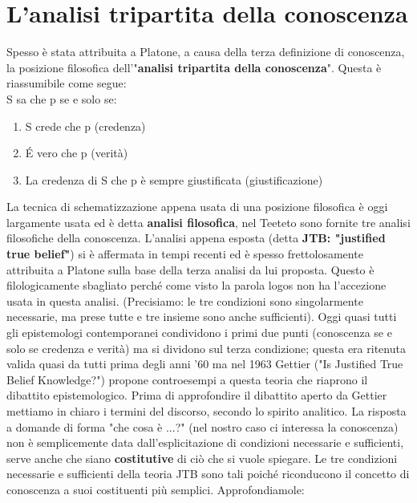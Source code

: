 \documentclass[10pt,a4paper]{article}
\begin{document}
\newpage

\section{L'analisi tripartita della conoscenza}
Spesso è stata attribuita a Platone, a causa della terza definizione di conoscenza, la posizione filosofica dell'"\textbf{analisi tripartita della conoscenza}". Questa è riassumibile come segue:\\
S sa che p se e solo se:
\begin{enumerate}
	\item S crede che p (credenza)
	\item \'E vero che p (verità)
	\item La credenza di S che p è sempre giustificata (giustificazione)
\end{enumerate}
La tecnica di schematizzazione appena usata di una posizione filosofica è oggi largamente usata ed è detta \textbf{analisi filosofica}, nel Teeteto sono fornite tre analisi filosofiche della conoscenza. L'analisi appena esposta (detta \textbf{JTB: "justified true belief"}) si è affermata in tempi recenti ed è spesso frettolosamente attribuita a Platone sulla base della terza analisi da lui proposta. Questo è filologicamente sbagliato perché come visto la parola logos non ha l'accezione usata in questa analisi. (Precisiamo: le tre condizioni sono singolarmente necessarie, ma prese tutte e tre insieme sono anche sufficienti). Oggi quasi tutti gli epistemologi contemporanei condividono i primi due punti (conoscenza se e solo se credenza e verità) ma si dividono sul terza condizione; questa era ritenuta valida quasi da tutti prima degli anni '60 ma nel 1963 Gettier ("Is Justified True Belief Knowledge?") propone controesempi a questa teoria che riaprono il dibattito epistemologico. Prima di approfondire il dibattito aperto da Gettier mettiamo in chiaro i termini del discorso, secondo lo spirito analitico. La risposta a domande di forma "che cosa è ...?" (nel nostro caso ci interessa la conoscenza) non è semplicemente data dall'esplicitazione di condizioni necessarie e sufficienti, serve anche che siano \textbf{costitutive} di ciò che si vuole spiegare. Le tre condizioni necessarie e sufficienti della teoria JTB sono tali poiché riconducono il concetto di conoscenza a suoi costituenti più semplici. Approfondiamole:
\end{document}
